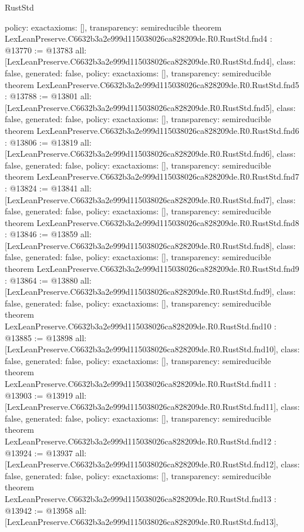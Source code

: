 \begin{lexlean}{RustStd}
\begin{coremodule}
{  policy: exact{axioms: []},
  transparency: semireducible
}
theorem LexLeanPreserve.C6632b3a2e999d115038026ca828209de.R0.RustStd.fnd4 : @13770 := @13783 {
  all: [LexLeanPreserve.C6632b3a2e999d115038026ca828209de.R0.RustStd.fnd4],
  class: false,
  generated: false,
  policy: exact{axioms: []},
  transparency: semireducible
}
theorem LexLeanPreserve.C6632b3a2e999d115038026ca828209de.R0.RustStd.fnd5 : @13788 := @13801 {
  all: [LexLeanPreserve.C6632b3a2e999d115038026ca828209de.R0.RustStd.fnd5],
  class: false,
  generated: false,
  policy: exact{axioms: []},
  transparency: semireducible
}
theorem LexLeanPreserve.C6632b3a2e999d115038026ca828209de.R0.RustStd.fnd6 : @13806 := @13819 {
  all: [LexLeanPreserve.C6632b3a2e999d115038026ca828209de.R0.RustStd.fnd6],
  class: false,
  generated: false,
  policy: exact{axioms: []},
  transparency: semireducible
}
theorem LexLeanPreserve.C6632b3a2e999d115038026ca828209de.R0.RustStd.fnd7 : @13824 := @13841 {
  all: [LexLeanPreserve.C6632b3a2e999d115038026ca828209de.R0.RustStd.fnd7],
  class: false,
  generated: false,
  policy: exact{axioms: []},
  transparency: semireducible
}
theorem LexLeanPreserve.C6632b3a2e999d115038026ca828209de.R0.RustStd.fnd8 : @13846 := @13859 {
  all: [LexLeanPreserve.C6632b3a2e999d115038026ca828209de.R0.RustStd.fnd8],
  class: false,
  generated: false,
  policy: exact{axioms: []},
  transparency: semireducible
}
theorem LexLeanPreserve.C6632b3a2e999d115038026ca828209de.R0.RustStd.fnd9 : @13864 := @13880 {
  all: [LexLeanPreserve.C6632b3a2e999d115038026ca828209de.R0.RustStd.fnd9],
  class: false,
  generated: false,
  policy: exact{axioms: []},
  transparency: semireducible
}
theorem LexLeanPreserve.C6632b3a2e999d115038026ca828209de.R0.RustStd.fnd10 : @13885 := @13898 {
  all: [LexLeanPreserve.C6632b3a2e999d115038026ca828209de.R0.RustStd.fnd10],
  class: false,
  generated: false,
  policy: exact{axioms: []},
  transparency: semireducible
}
theorem LexLeanPreserve.C6632b3a2e999d115038026ca828209de.R0.RustStd.fnd11 : @13903 := @13919 {
  all: [LexLeanPreserve.C6632b3a2e999d115038026ca828209de.R0.RustStd.fnd11],
  class: false,
  generated: false,
  policy: exact{axioms: []},
  transparency: semireducible
}
theorem LexLeanPreserve.C6632b3a2e999d115038026ca828209de.R0.RustStd.fnd12 : @13924 := @13937 {
  all: [LexLeanPreserve.C6632b3a2e999d115038026ca828209de.R0.RustStd.fnd12],
  class: false,
  generated: false,
  policy: exact{axioms: []},
  transparency: semireducible
}
theorem LexLeanPreserve.C6632b3a2e999d115038026ca828209de.R0.RustStd.fnd13 : @13942 := @13958 {
  all: [LexLeanPreserve.C6632b3a2e999d115038026ca828209de.R0.RustStd.fnd13],
}
\end{coremodule}
\end{lexlean}
